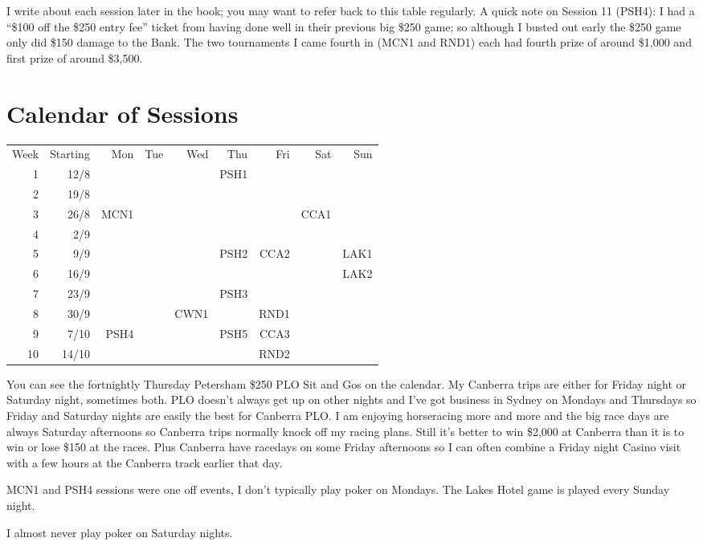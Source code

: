 I write about each session later in the book; you may want to
refer back to this table regularly. A quick note on Session 11 (PSH4): I had
a ``\$100 off the \$250 entry fee'' ticket from having done well in
their previous big \$250 game; so although I busted out early the \$250
game only did \$150 damage to the Bank. The two tournaments I came
fourth in (MCN1 and RND1) each had fourth prize of around \$1,000 and
first prize of around \$3,500.

\section*{Calendar of Sessions}

\begin{tabular}{rrrrrrrrr}
  Week & Starting & Mon & Tue & Wed & Thu & Fri & Sat & Sun \\
  1 & 12/8  &     &     &     & PSH1 &     &     &     \\
  2 & 19/8  &     &     &     &      &     &     &     \\
  3 & 26/8  & MCN1 &    &     &      &     & CCA1 &    \\
  4 & 2/9  &      &    &     &      &     &     &     \\
  5 &  9/9  &     &     &     & PSH2 & CCA2&     & LAK1\\
  6 & 16/9  &     &     &     &      &     &     & LAK2\\
  7 & 23/9  &     &     &     & PSH3 &     &     &     \\
  8 & 30/9  &     &     & CWN1&      & RND1&     &     \\
  9 & 7/10 & PSH4 &    &     & PSH5 & CCA3&     &     \\
 10 & 14/10 &     &     &     &      & RND2&     &     \\
\end{tabular}

You can see the fortnightly Thursday Petersham \$250 PLO Sit and Gos
on the calendar. My Canberra trips are either for Friday night or
Saturday night, sometimes both. PLO doesn't always get up on other
nights and I've got business in Sydney on Mondays and Thursdays so
Friday and Saturday nights are easily the best for Canberra PLO. I
am enjoying horseracing more and more and the big race days are always
Saturday afternoons so Canberra trips normally knock off my racing
plans. Still it's better to win \$2,000 at Canberra than it is to win
or lose \$150 at the races. Plus Canberra have racedays on some Friday
afternoons so I can often combine a Friday night Casino visit with a
few hours at the Canberra track earlier that day.

MCN1 and PSH4 sessions were one off events, I don't typically play
poker on Mondays. The Lakes Hotel game is played every Sunday night.

I almost never play poker on Saturday nights.
